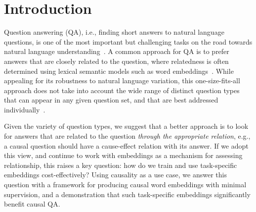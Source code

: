 
\section{Introduction}
\label{sec-emnlp2016:introduction}

Question answering (QA), i.e., finding short answers to natural language questions, is one of the most important but challenging 
tasks on the road towards natural language understanding~\cite{Etzioni:11}. 
A common approach for QA is to prefer answers that are closely related to the question, where relatedness is often determined using lexical semantic models such as word embeddings~\cite{yih13,jansen14,fried2015higher}. 
While appealing for its robustness to natural language variation, this one-size-fits-all approach does not take into account the wide range of distinct question types that can appear in any given question set, and that are best addressed individually~\cite{chu2004ibm,ferrucci2010building,clark2013study}.  

Given the variety of question types, we suggest that a better approach is to look for answers %
that are related to the question \emph{through the appropriate relation}, e.g., a causal question should have a cause-effect relation with its answer.
If we adopt this view, and continue to work with embeddings as a mechanism for assessing relationship,
this raises a key question: how do we train and use task-specific embeddings cost-effectively? 
Using causality as a use case, we answer this question with a framework for producing causal word embeddings with minimal supervision, and a demonstration that such task-specific embeddings significantly benefit causal QA. 


